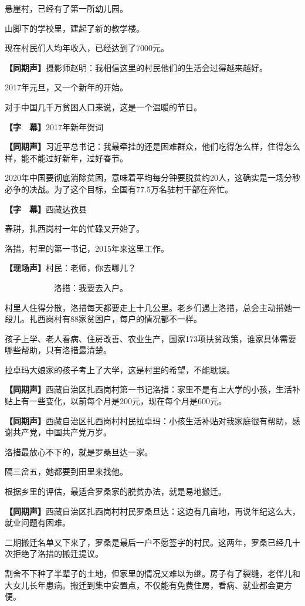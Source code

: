 \documentclass{ctexart}
\newcommand{\zkh}[1]{\textbf{\hspace{-2.7em} 【#1】}}
\begin{document}
悬崖村，已经有了第一所幼儿园。

山脚下的学校里，建起了新的教学楼。

现在村民们人均年收入，已经达到了7000元。

\zkh{同期声}摄影师赵明：我相信这里的村民他们的生活会过得越来越好。

2017年元旦，又一个新年的开始。

对于中国几千万贫困人口来说，这是一个温暖的节日。

\zkh{字　幕}2017年新年贺词

\zkh{同期声}习近平总书记：我最牵挂的还是困难群众，他们吃得怎么样，住得怎么样，能不能过好新年，过好春节。

2020年中国要彻底消除贫困，意味着平均每分钟要脱贫约20人，这确实是一场分秒必争的决战。为了这个目标，全国有77.5万名驻村干部在奔忙。

\zkh{字　幕}西藏达孜县

春耕，扎西岗村一年的忙碌又开始了。

洛措，村里的第一书记，2015年来这里工作。

\zkh{现场声}村民：老师，你去哪儿？

　　　　　　洛措：我要去入户。

村里人住得分散，洛措每天都要走上十几公里。老乡们遇上洛措，总会主动捎她一段儿。扎西岗村有88家贫困户，每户的情况都不一样。

孩子上学、老人看病、住房改善、农业生产，国家173项扶贫政策，谁家具体需要哪些帮助，只有洛措最清楚。

拉卓玛大娘家的孩子考上了大学，这是村里的希望，不能耽误。

\zkh{同期声}西藏自治区扎西岗村第一书记洛措：家里不是有上大学的小孩，生活补贴上有一些变化，以前每个月是200元，现在每个月是600元。

\zkh{同期声}西藏自治区扎西岗村村民拉卓玛：小孩生活补贴对我家庭很有帮助，感谢共产党，中国共产党万岁。

洛措最放心不下的，就是罗桑旦达一家。

隔三岔五，她都要到田里来找他。

根据乡里的评估，最适合罗桑家的脱贫办法，就是易地搬迁。

\zkh{同期声}西藏自治区扎西岗村村民罗桑旦达：这边有几亩地，再说年纪这么大，就业问题有困难。

二期搬迁名单又下来了，罗桑是最后一户不愿签字的村民。这两年，罗桑已经几十次拒绝了洛措的搬迁提议。

割舍不下种了半辈子的土地，但家里的情况又难以为继。房子有了裂缝，老伴儿和大女儿长年患病。搬迁到集中安置点，不仅能有免费住房，看病、就业都会更方便。
\end{document}
